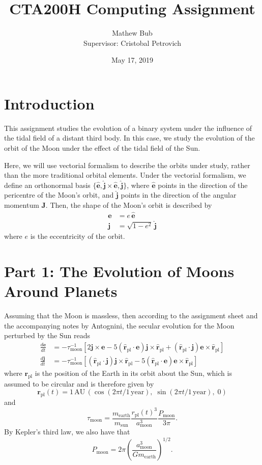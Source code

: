 \documentclass[10pt]{article}
\title{CTA200H Computing Assignment}
\author{Mathew Bub \\ Supervisor: Cristobal Petrovich}
\date{May 17, 2019}
\newcommand{\evec}{\mathbf{e}}
\newcommand{\ehat}{\hat{\evec}}
\newcommand{\jvec}{\mathbf{j}}
\newcommand{\jhat}{\hat{\jvec}}
\newcommand{\Jvec}{\mathbf{J}}
\newcommand{\rpl}{\mathbf{r_{\mathrm{pl}}}}
\newcommand{\rplhat}{\mathbf{\hat{r}_{\mathrm{pl}}}}
\begin{document}
\maketitle

\section*{Introduction}
This assignment studies the evolution of a binary system under the influence of the tidal field of a distant third body. In this case, we study the evolution of the orbit of the Moon under the effect of the tidal field of the Sun.

Here, we will use vectorial formalism \parencite{tremaine2014} to describe the orbits under study, rather than the more traditional orbital elements. Under the vectorial formalism, we define an orthonormal basis $\{\ehat, \jhat \times \ehat, \jhat\}$, where $\ehat$ points in the direction of the pericentre of the Moon's orbit, and $\jhat$ points in the direction of the angular momentum $\Jvec$. Then, the shape of the Moon's orbit is described by
\begin{align}
    \evec &= e \, \ehat \label{eq:evec} \\
    \jvec &= \sqrt{1-e^2} \, \jhat \label{eq:jvec}
\end{align}
where $e$ is the eccentricity of the orbit. 

\section*{Part 1: The Evolution of Moons Around Planets}
Assuming that the Moon is massless, then according to the assignment sheet and the accompanying notes by Antognini, the secular evolution for the Moon perturbed by the Sun reads
\begin{align}
    \frac{d\evec}{dt} &= -\tau_{\mathrm{moon}}^{-1}[2 \jvec \times \evec - 5(\rplhat \cdot \evec) \jvec \times \rplhat + (\rplhat \cdot \jvec) \evec \times \rplhat] \label{eq:devec} \\
    \frac{d\jvec}{dt} &= -\tau_{\mathrm{moon}}^{-1}[(\rplhat \cdot \jvec) \jvec \times \rplhat - 5(\rplhat \cdot \evec) \evec \times \rplhat] \label{eq:djvec}
\end{align}
where $\rpl$ is the position of the Earth in its orbit about the Sun, which is assumed to be circular and is therefore given by
\begin{equation} \label{eq:rpl}
    \rpl(t) = 1 \, \mathrm{AU} \, (\cos(2 \pi t/1 \, \mathrm{year}), \; \sin(2 \pi t/1 \, \mathrm{year}), \; 0)
\end{equation}
and
\begin{equation} \label{eq:tau}
    \tau_{\mathrm{moon}} = \frac{m_{\mathrm{earth}}}{m_{\mathrm{sun}}} \frac{r_{\mathrm{pl}}(t)^3}{a_{\mathrm{moon}}^3} \frac{P_{\mathrm{moon}}}{3 \pi}.
\end{equation}
By Kepler's third law, we also have that
\begin{equation} \label{eq:Pmoon}
    P_{\mathrm{moon}} = 2\pi \left( \frac{a_{\mathrm{moon}}^3}{Gm_{\mathrm{earth}}} \right)^{1/2}.
\end{equation}
\end{document}
